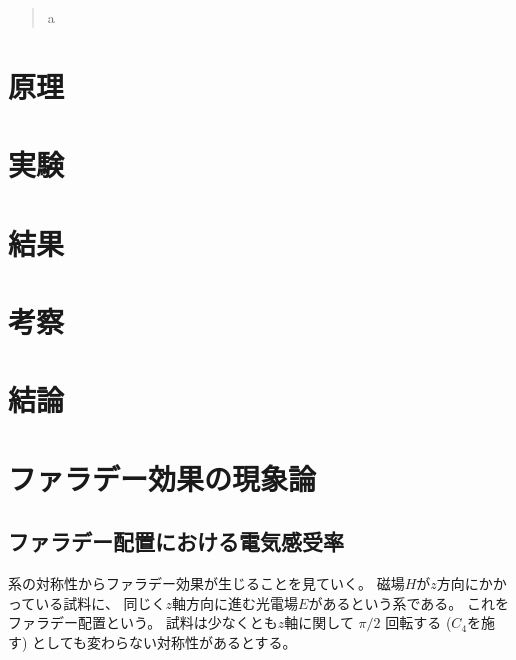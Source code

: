 \documentclass[9pt,dvipdfmx,a4paper]{jsarticle}
\begin{document}

\begin{abstract}
    a
\end{abstract}


\section{原理}

\section{実験}

\section{結果}

\section{考察}

\section{結論}



\nocite{*}
\appendix
\section{ファラデー効果の現象論}
\subsection{ファラデー配置における電気感受率}
系の対称性からファラデー効果が生じることを見ていく。
磁場\(H\)が\(z\)方向にかかっている試料に、
同じく\(z\)軸方向に進む光電場\(E\)があるという系である。
これをファラデー配置という。
試料は少なくとも\(z\)軸に関して \(\pi/2\) 回転する (\(C_4\)を施す) としても変わらない対称性があるとする。
\end{document}
